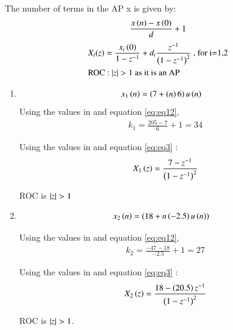\documentclass[journal,12pt,twocolumn]{IEEEtran}
\theoremstyle{remark}
\begin{document}

The number of terms in the AP x is given by: 
\begin{align}  \label{eq:eq12}
    \frac{x\left(n\right) - x\left(0\right)}{d} + 1
\end{align}
\begin{align}
    &X_i(z) = \frac{x_i\left(0\right)}{1 - z^{-1}} + d_i\frac{z^{-1}}{\left(1-z^{-1}\right)^2} \text{ , for i=1,2} \label{eq:eq3}\\
    &\text{ROC : $\left\vert z\right\vert > 1$ as it is an AP}   
\end{align}
\begin{enumerate}
    \item 
\begin{align}
x_{1}\left(n\right) &= \left(7 + \left(n\right)6\right)u\left(n\right)
\end{align}
Using the values in  and equation \eqref{eq:eq12},
\begin{align}
    k_1 = \frac{205 - 7}{6} + 1 = 34
\end{align}

Using the values in  and equation \eqref{eq:eq3} :
\begin{align}
 X_1\left(z\right) = \frac{7 - z^{-1}}{\left(1-z^{-1}\right)^2}
\end{align}

ROC is $\left\vert z\right\vert > 1$
 
   \item
   
\begin{align}
    x_{2}\left(n\right) &= \left(18 + n\left(-2.5\right)u\left(n\right)\right)
\end{align}

Using the values in  and equation \eqref{eq:eq12},
\begin{align}
    k_2 = \frac{-47 - 18}{-2.5} + 1 = 27
\end{align}

Using the values in  and equation \eqref{eq:eq3} :
\begin{align} 
 X_2\left(z\right) = \frac{18 - \left(20.5\right)z^{-1}}{\left(1 - z^{-1}\right)^2}
\end{align}

ROC is $\left\vert z\right\vert > 1$.


\end{enumerate}
\end{document}
